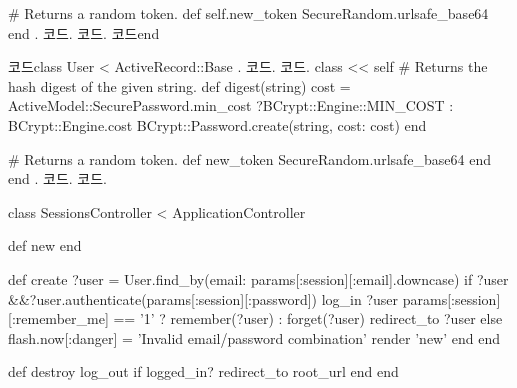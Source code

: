 {{\begin{codelisting}
\begin{code}
# Returns a random token. def self.new_token SecureRandom.urlsafe_base64 end . 코드. 코드. 코드end \end{code} \end{codelisting} 

\begin{codelisting} \label{code:token_digest_class_self}  

\begin{code} 코드class User < ActiveRecord::Base . 코드. 코드. class << self # Returns the hash digest of the given string. def digest(string) cost = ActiveModel::SecurePassword.min_cost ?BCrypt::Engine::MIN_COST : BCrypt::Engine.cost BCrypt::Password.create(string, cost: cost) end 

# Returns a random token. def new_token SecureRandom.urlsafe_base64 end end . 코드. 코드. \end{code} \end{codelisting} 

\begin{codelisting} \label{code:login_create_user_instance}  

\begin{code} class SessionsController < ApplicationController 

def new end 

def create ?user = User.find_by(email: params[:session][:email].downcase) if ?user &&?user.authenticate(params[:session][:password]) log_in ?user params[:session][:remember_me] == '1' ? remember(?user) : forget(?user) redirect_to ?user else flash.now[:danger] = 'Invalid email/password combination' render 'new' end end 

def destroy log_out if logged_in? redirect_to root_url end end \end{code} \end{codelisting} 

\begin{codelisting} \label{code:improved_remember_me_test}  


\end{codelisting}}}
